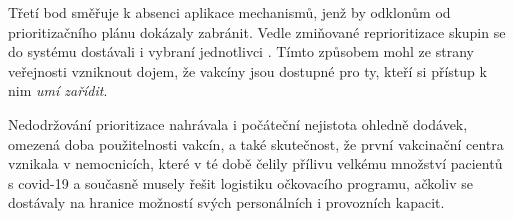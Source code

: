 Třetí bod směřuje k absenci aplikace mechanismů, jenž by odklonům od prioritizačního plánu dokázaly zabránit.
Vedle zmiňované reprioritizace skupin se do systému dostávali i vybraní jednotlivci \cite{logoc_namestkyne, logoc_kabatek, CTK2021JsemDenik, logo_hejtman, logo_predbihani}.
Tímto způsobem mohl ze strany veřejnosti vzniknout dojem, že vakcíny jsou dostupné pro ty, kteří si přístup k nim \emph{umí zařídit}. 

Nedodržování prioritizace nahrávala i počáteční nejistota ohledně dodávek, omezená doba použitelnosti vakcín, a také skutečnost, že první vakcinační centra vznikala v nemocnicích, které v té době čelily přílivu velkému množství pacientů s covid-19 a současně musely řešit logistiku očkovacího programu, ačkoliv se dostávaly na hranice možností svých personálních i provozních kapacit. 


 
